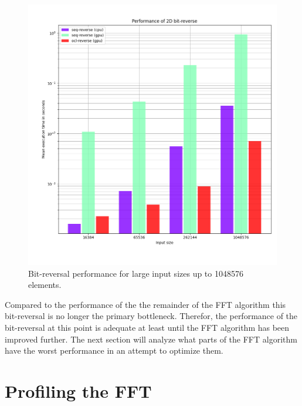 \documentclass[conference]{IEEEtran}
\begin{document}
\begin{figure}[h]
	\centering
	\includegraphics[width=1\linewidth]{resources/images/bit-reverse-cl-high.png}
	\caption{Bit-reversal performance for large input sizes up to 1048576 elements.}
	\label{fig:bitrevperfh}
\end{figure}

Compared to the performance of the the remainder of the FFT algorithm this
bit-reversal is no longer the primary bottleneck. Therefor, the performance of
the bit-reversal at this point is adequate at least until the FFT algorithm
has been improved further. The next section will analyze what parts of the
FFT algorithm have the worst performance in an attempt to optimize them.

\section{Profiling the FFT}
\end{document}
